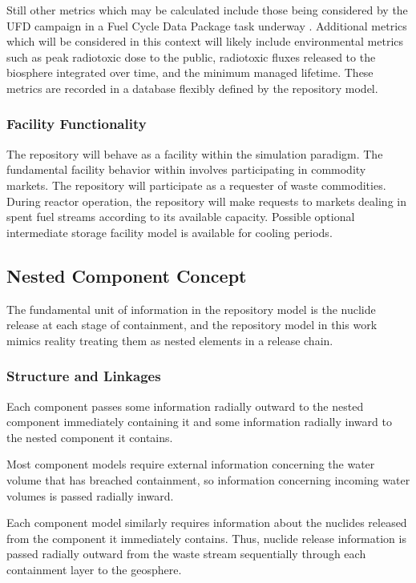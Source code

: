 Still other metrics which may be calculated include those being considered by 
the \gls{UFD} campaign in a Fuel Cycle Data Package task underway 
\cite{nutt_personal_2011}. Additional metrics which will be considered in this
context will likely include environmental metrics such as peak radiotoxic dose 
to the public, radiotoxic fluxes released to the biosphere integrated over time, 
and the minimum managed lifetime.  These metrics are recorded in a database 
flexibly defined by the repository model. 

\subsubsection{Facility Functionality}

The repository will behave as a facility within the \Cyclus simulation 
paradigm. The fundamental facility behavior within \Cyclus involves 
participating in commodity markets. The repository will participate as 
a requester of waste commodities. During reactor operation, the 
repository will make requests to markets dealing in spent fuel streams 
according to its available capacity. Possible optional intermediate storage facility 
model is available for cooling periods.

\subsection{Nested Component Concept}

The fundamental unit of information in the repository model is the 
nuclide release at each stage of containment, and the repository model 
in this work mimics reality treating them as nested elements in a 
release chain.


\subsubsection{Structure and Linkages}

Each component passes some information radially outward to the nested 
component immediately containing it and some information radially 
inward to the nested component it contains.

Most component models require external information concerning the 
water volume that has breached containment, so information concerning 
incoming water volumes is passed radially inward. 

Each component model similarly requires information about the nuclides 
released from the component it immediately contains.  Thus, nuclide 
release information is passed radially outward from the waste stream 
sequentially through each containment layer to the geosphere.


